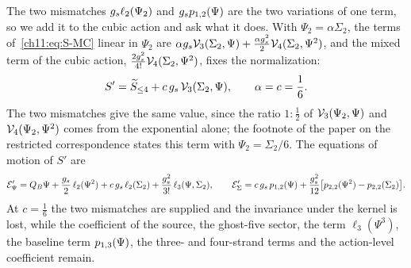 \noindent{}
The two mismatches $\gs \ell_2(\Psi_2)$ and $\gs \sprod{1}{2}(\Psi)$ are the two variations of one term, so we add it to the cubic action and ask what it does.
With $\Psi_2 = \alpha \Sigma_2$, the terms of~\eqref{ch11:eq:S-MC} linear in $\Psi_2$ are $\alpha \gs \vertex{3}(\Sigma_2, \Psi) + \tfrac{\alpha \gs^2}{2} \vertex{4}(\Sigma_2, \Psi^2)$, and the mixed term of the cubic action, $\tfrac{2 \gs^2}{4!} \vertex{4}(\Sigma_2, \Psi^2)$, fixes the normalization:
\begin{equation}
  S'
    = \caction[\le 4] + c \, \gs \, \vertex{3}(\Sigma_2, \Psi),
  \qquad
  \alpha
    = c
    = \frac{1}{6}.
\end{equation}
The two mismatches give the same value, since the ratio $1 : \tfrac{1}{2}$ of $\vertex{3}(\Psi_2, \Psi)$ and $\vertex{4}(\Psi_2, \Psi^2)$ comes from the exponential alone; the footnote of the paper on the restricted correspondence states this term with $\Psi_2 = \Sigma_2 / 6$.
The equations of motion of $S'$ are
\begin{equation}
  \mathcal{E}'_\Psi
    = Q_B \Psi + \frac{\gs}{2} \, \ell_2(\Psi^2) + c \, \gs \, \ell_2(\Sigma_2) + \frac{\gs^2}{3!} \, \ell_3(\Psi, \Sigma_2),
  \qquad
  \mathcal{E}'_\Sigma
    = c \, \gs \, \sprod{1}{2}(\Psi) + \frac{\gs^2}{12} \bigl[ \sprod{2}{2}(\Psi^2) - \sprod{2}{2}(\Sigma_2) \bigr].
\end{equation}
At $c = \tfrac{1}{6}$ the two mismatches are supplied and the invariance under the kernel is lost, while the coefficient of the source, the ghost-five sector, the term $\ell_3(\Psi^3)$, the baseline term $\sprod{1}{3}(\Psi)$, the three- and four-strand terms and the action-level coefficient remain.

